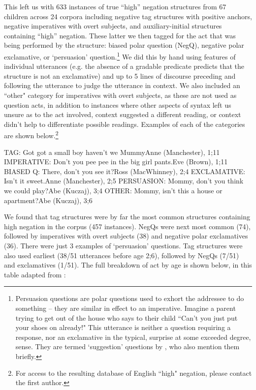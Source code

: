 \documentclass[output=paper,colorlinks,citecolor=brown]{langscibook}
\begin{document}
This left us with 633 instances of true ``high'' negation structures from 67 children across 24 corpora including negative tag structures with positive anchors, negative imperatives with overt subjects, and auxiliary-initial structures containing ``high'' negation. These latter we then tagged for the act that was being performed by the structure: biased polar question (NegQ), negative polar exclamative, or `persuasion' question.\footnote{Persuasion questions are polar questions used to exhort the addressee to do something – they are similar in effect to an imperative. Imagine a parent trying to get out of the house who says to their child ``Can't you just put your shoes on already!" This utterance is neither a question requiring a response, nor an exclamative in the typical, surprise at some exceeded degree, sense. They are termed `suggestion' questions by \citet{romerohan2004}, who also mention them briefly.} We did this by hand using features of individual utterances (e.g. the absence of a gradable predicate predicts that the structure is not an exclamative) and up to 5 lines of discourse preceding and following the utterance to judge the utterance in context. We also included an ``other" category for imperatives with overt subjects, as these are not used as question acts, in addition to instances where other aspects of syntax left us unsure as to the act involved, context suggested a different reading, or context didn't help to differentiate possible readings. Examples of each of the categories are shown below.\footnote{For access to the resulting database of English ``high" negation, please contact the first author.}

\ea TAG: Got got a small boy haven't we Mummy\phantom{a}\hfill Anne (Manchester), 1;11
\ex IMPERATIVE: Don't you pee pee in the big girl pants.\phantom{a}\hfill Eve (Brown), 1;11
\ex BIASED Q: There, don't you see it?\phantom{a}\hfill Ross (MacWhinney), 2;4
\ex EXCLAMATIVE: Isn't it sweet.\phantom{a}\hfill Anne (Manchester), 2;5
\ex PERSUASION: Mommy, don't you think we could play?\phantom{a}\hfill Abe (Kuczaj), 3;4
\ex OTHER: Mommy, isn't this a house or apartment?\phantom{a}\hfill Abe (Kuczaj), 3;6
\z


We found that tag structures were by far the most common structures containing high negation in the corpus (457 instances). NegQs were next most common (74), followed by imperatives with overt subjects (38) and negative polar exclamatives (36). There were just 3 examples of `persuasion' questions. Tag structures were also used earliest (38/51 utterances before age 2;6), followed by NegQs (7/51) and exclamatives (1/51). The full breakdown of act by age is shown below, in this table adapted from \citet[765]{woodsroeper2021}:
\end{document}
